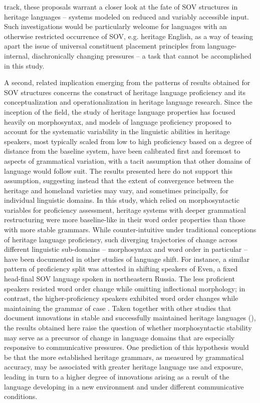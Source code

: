 \documentclass[output=paper]{langscibook}
\begin{document}
track, these proposals warrant a closer look at the fate of SOV structures in heritage languages – systems modeled on reduced and variably accessible input. Such investigations would be particularly welcome for languages with an otherwise restricted occurrence of SOV, e.g. heritage English, as a way of teasing apart the issue of universal constituent placement principles from language-internal, diachronically changing pressures – a task that cannot be accomplished in this study.

A second, related implication emerging from the patterns of results obtained for SOV structures concerns the construct of heritage language proficiency and its conceptualization and operationalization in heritage language research. Since the inception of the field, the study of heritage language properties has focused heavily on morphosyntax, and models of language proficiency proposed to account for the systematic variability in the linguistic abilities in heritage speakers, most typically scaled from low to high proficiency based on a degree of distance from the baseline system, have been calibrated first and foremost to aspects of grammatical variation, with a tacit assumption that other domains of language would follow suit. The results presented here do not support this assumption, suggesting instead that the extent of convergence between the heritage and homeland varieties may vary, and sometimes principally, for individual linguistic domains. In this study, which relied on morphosyntactic variables for proficiency assessment, heritage systems with deeper grammatical restructuring were more baseline-like in their word order properties than those with more stable grammars. While counter-intuitive under traditional conceptions of heritage language proficiency, such diverging trajectories of change across different linguistic sub-domains – morphosyntax and word order in particular – have been documented in other studies of language shift. For instance, a similar pattern of proficiency split was attested in shifting speakers of Even, a fixed head-final SOV language spoken in northeastern Russia. The less proficient speakers resisted word order change while omitting inflectional morphology; in contrast, the higher-proficiency speakers exhibited word order changes while maintaining the grammar of case \citep{KantarovichNesterova2021}. Taken together with other studies that document innovations in stable and successfully maintained heritage languages (\citealt{AalberseMoro2014, AalberseZhouAndringa2017}), the results obtained here raise the question of whether morphosyntactic stability may serve as a precursor of change in language domains that are especially responsive to communicative pressures. One prediction of this hypothesis would be that the more established heritage grammars, as measured by grammatical accuracy, may be associated with greater heritage language use and exposure, leading in turn to a higher degree of innovations arising as a result of the language developing in a new environment and under different communicative conditions.
\end{document}
